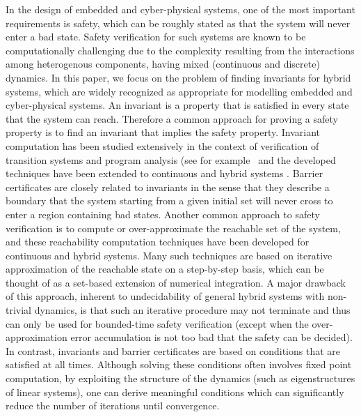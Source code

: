 In the design of embedded and cyber-physical systems, one of the most
important requirements is safety, which can be roughly stated as that
the system will never enter a bad state. Safety verification for such
systems are known to be computationally challenging due to the
complexity resulting from the interactions among heterogenous
components, having mixed (continuous and discrete) dynamics. In this
paper, we focus on the problem of finding invariants for hybrid
systems, which are widely recognized as appropriate for modelling
embedded and cyber-physical systems. An invariant is a property that
is satisfied in every state that the system can reach. Therefore a
common approach for proving a safety property is to find an invariant
that implies the safety property. Invariant computation has been
studied extensively in the context of verification of transition
systems and program analysis (see for
example~\cite{CousotHalbwachs78,DBLP:journals/fmsd/BensalemL99,DBLP:conf/tacas/TiwariRSS01,DBLP:conf/cav/ColonSS03,DBLP:conf/sas/Goubault13}
and the developed techniques have been extended to continuous and
hybrid
systems \cite{DBLP:conf/hybrid/SankaranarayananSM04,jeannet2009apron,DBLP:conf/hybrid/Rodriguez-CarbonellT05,DBLP:conf/cdc/SassiGS14,DBLP:journals/tecs/AllamigeonGSGP16,HybridFluctuat,DBLP:conf/vmcai/SogokonGJP16,DBLP:conf/aplas/DangG11}. Barrier
certificates \cite{prajna2004safety} are closely related to invariants
in the sense that they describe a boundary that the system starting
from a given initial set will never cross to enter a region containing
bad states. Another common approach to safety verification is to
compute or over-approximate the reachable set of the system, and these
reachability computation techniques have been developed for continuous
and hybrid systems.  Many such techniques are based on iterative
approximation of the reachable state on a step-by-step basis, which
can be thought of as a set-based extension of numerical integration. A
major drawback of this approach, inherent to undecidability of general
hybrid systems with non-trivial dynamics, is that such an iterative
procedure may not terminate and thus can only be used for bounded-time
safety verification (except when the over-approximation error
accumulation is not too bad that the safety can be decided). In
contrast, invariants and barrier certificates are based
on conditions that are satisfied at all times. Although solving these
conditions often involves fixed point computation, by exploiting the
structure of the dynamics (such as eigenstructures of linear systems),
one can derive meaningful conditions which can significantly reduce
the number of iterations until convergence.


